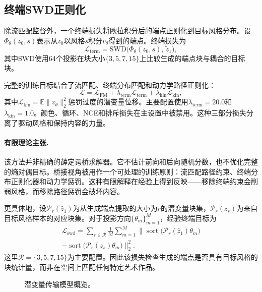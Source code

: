 ﻿\documentclass[letterpaper]{article}
\begin{document}
\subsection{终端SWD正则化}
除流匹配监督外，一个终端损失将欧拉积分后的端点正则化到目标风格分布。设$\Phi_\theta(z_0,s)$表示从$z_0$以风格$s$积分$v_\theta$得到的端点。终端损失为
\begin{equation}
    \mathcal{L}_{\mathrm{term}} = \mathrm{SWD}\bigl(\Phi_\theta(z_0,s),\,\tilde{z}_1\bigr),
\end{equation}
其中SWD使用64个投影在块大小$\{3,5,7,15\}$上比较生成的端点块与耦合的目标块。

完整的训练目标结合了流匹配、终端分布匹配和动力学路径正则化：
\begin{equation}
    \mathcal{L} = \mathcal{L}_{\mathrm{FM}} + \lambda_{\mathrm{term}}\mathcal{L}_{\mathrm{term}} + \lambda_{\mathrm{kin}}\mathcal{L}_{\mathrm{kin}},
\end{equation}
其中$\mathcal{L}_{\mathrm{kin}} = \mathbb{E}\|v_\theta\|_2^2$惩罚过度的潜变量位移。主要配置使用$\lambda_{\mathrm{term}}=20.0$和$\lambda_{\mathrm{kin}}=1.0$。颜色、循环、NCE和排斥损失在主设置中被禁用。这种三部分损失分离了驱动风格和保持内容的力量。

\paragraph{有限理论主张.}
该方法并非精确的薛定谔桥求解器。它不估计前向和后向随机分数，也不优化完整的熵对偶目标。桥接视角被用作一个可处理的训练原则：流匹配路径约束、终端分布正则化器和动力学惩罚。这种有限解释在经验上得到反映——移除终端约束会削弱风格，而移除路径惩罚会破坏内容。

更具体地，设$\mathcal{P}_r(\hat{z}_1)$为从生成端点提取的大小为$r$的潜变量块集，$\mathcal{P}_r(z_s)$为来自目标风格样本的对应块集。对于投影方向$\{\theta_m\}_{m=1}^M$，经验终端目标为
\begin{multline}
    \mathcal{L}_{\mathrm{swd}} =
    \sum_{r\in\mathcal{R}} \frac{1}{M} \sum_{m=1}^{M}
    \bigl\|
    \operatorname{sort}\!\bigl(\mathcal{P}_r(\hat{z}_1)\theta_m\bigr) \\
    -
    \operatorname{sort}\!\bigl(\mathcal{P}_r(z_s)\theta_m\bigr)
    \bigr\|_2^2 .
\end{multline}
这里$\mathcal{R}=\{3,5,7,15\}$为主要配置。因此该损失检查生成的端点是否具有目标风格的块统计量，而非在空间上匹配任何特定艺术作品。


\begin{figure}[t]
    \centering
    \vspace{-0.5cm}
    \resizebox{0.88\columnwidth}{!}{}
    \caption{潜变量传输模型概览。}
    \label{fig:framework}
\end{figure}
\end{document}
